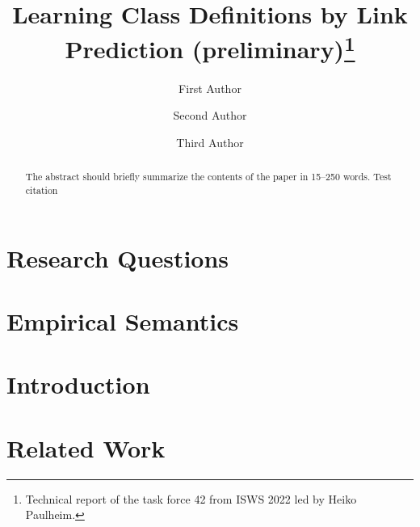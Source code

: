 \documentclass[runningheads]{llncs}
\begin{document}
%
\title{Learning Class Definitions by Link Prediction (preliminary)\thanks{Technical report of the task force 42 from ISWS 2022 led by Heiko Paulheim.}}

%
%
\author{First Author \and
Second Author \and
Third Author}
%
%
%
\maketitle              %
%
\begin{abstract}
The abstract should briefly summarize the contents of the paper in
15--250 words.  Test citation \cite{Berners-Lee2001}

\end{abstract}

\section{Research Questions}
\label{sec:rq}



\section{Empirical Semantics}
\label{sec:def}


\section{Introduction}
\label{sec:intro}


\section{Related Work}
\label{sec:related}

\end{document}
